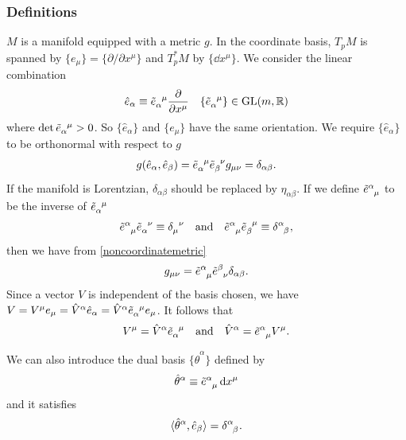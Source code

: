 \documentclass[10pt]{article}
\begin{document}
\subsubsection{Definitions}
$M$ is a manifold equipped with a metric $g$.
In the coordinate basis, $T_p M$ is spanned by $\{e_\mu\}=\{\partial/\partial x^\mu\}$ and $T^*_p M$ by $\{\dd{x^\mu}\}$.
We consider the linear combination
\begin{align}
    \hat{e}_\alpha\equiv \tensor{\tilde{e}}{_\alpha^\mu}\pdv{x^\mu}\quad \{\tensor{\tilde{e}}{_\alpha^\mu}\}\in\text{GL}(m,\rr)\label{noncoordinatevectordef}
\end{align}
where $\det \tensor{\tilde{e}}{_\alpha^\mu}>0$.
So $\{\hat{e}_\alpha\}$ and $\{e_\mu\}$ have the same orientation.
We require $\{\hat{e}_\alpha\}$ to be orthonormal with respect to $g$
\begin{align}
    g(\hat{e}_\alpha,\hat{e}_\beta)=\tensor{\tilde{e}}{_\alpha^\mu}\tensor{\tilde{e}}{_\beta^\nu}g_{\mu\nu}=\delta_{\alpha\beta}.\label{noncoordinatemetric}
\end{align}
If the manifold is Lorentzian, $\delta_{\alpha\beta}$ should be replaced by $\eta_{\alpha\beta}$.
If we define $\tensor{\tilde{e}}{^\alpha_\mu}$ to be the inverse of $\tensor{\tilde{e}}{_\alpha^\mu}$
\begin{align}
    \tensor{\tilde{e}}{^\alpha_\mu}\tensor{\tilde{e}}{_\alpha^\nu}\equiv\tensor{\delta}{_\mu^\nu}\qand\tensor{\tilde{e}}{^\alpha_\mu}\tensor{\tilde{e}}{_\beta^\mu}\equiv\tensor{\delta}{^\alpha_\beta},
\end{align}
then we have from \eqref{noncoordinatemetric}
\begin{align}
    g_{\mu\nu}=\tensor{\tilde{e}}{^\alpha_\mu}\tensor{\tilde{e}}{^\beta_\nu}\delta_{\alpha\beta}.
\end{align}
Since a vector $V$ is independent of the basis chosen, we have $V=V^\mu e_\mu=\hat{V}^\alpha \hat{e}_\alpha=\hat{V}^\alpha\tensor{\tilde{e}}{_\alpha^\mu}e_\mu$.
It follows that
\begin{align}
    V^\mu=\hat{V}^\alpha\tensor{\tilde{e}}{_\alpha^\mu}\qand \hat{V}^\alpha=\tensor{\tilde{e}}{^\alpha_\mu}V^\mu.
\end{align}

We can also introduce the dual basis $\{\hat{\theta}^\alpha\}$ defined by
\begin{align}
    \hat{\theta}^\alpha\equiv\tensor{\tilde{e}}{^\alpha_\mu}\dd{x^\mu}
\end{align}
and it satisfies
\begin{align}
    \langle\hat{\theta}^\alpha,\hat{e}_\beta\rangle=\tensor{\delta}{^\alpha_\beta}.
\end{align}
\end{document}
